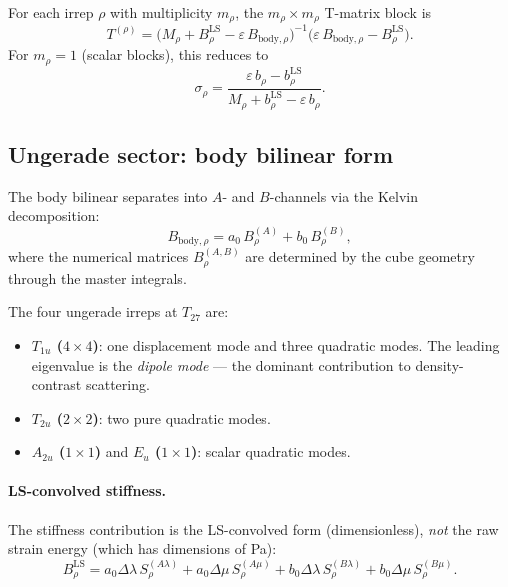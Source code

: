 \documentclass[11pt,a4paper]{article}
\newcommand{\D}{\Delta}
\newcommand{\BLS}{B^{\mathrm{LS}}}
\theoremstyle{plain}
\theoremstyle{definition}
\theoremstyle{remark}
\begin{document}
For each irrep $\rho$ with multiplicity $m_\rho$, the
$m_\rho \times m_\rho$ T-matrix block is
\begin{equation}
  \boxed{\;T^{(\rho)}
  = \bigl(M_\rho + \BLS_\rho - \varepsilon\,B_{\mathrm{body},\rho}
  \bigr)^{-1}
  \bigl(\varepsilon\,B_{\mathrm{body},\rho} - \BLS_\rho\bigr).\;}
  \label{eq:T-per-irrep}
\end{equation}
For $m_\rho = 1$ (scalar blocks), this reduces to
\begin{equation}
  \sigma_\rho
  = \frac{\varepsilon\,b_\rho - b^{\mathrm{LS}}_\rho}
    {M_\rho + b^{\mathrm{LS}}_\rho - \varepsilon\,b_\rho}.
  \label{eq:sigma-scalar}
\end{equation}

\subsection{Ungerade sector: body bilinear form}

The body bilinear separates into $A$- and $B$-channels via the Kelvin
decomposition:
\begin{equation}
  B_{\mathrm{body},\rho} = a_0\,B^{(A)}_\rho + b_0\,B^{(B)}_\rho,
  \label{eq:Bbody-AB}
\end{equation}
where the numerical matrices $B^{(A,B)}_\rho$ are determined by the
cube geometry through the master integrals.

The four ungerade irreps at $T_{27}$ are:
\begin{itemize}
  \item \textbf{$T_{1u}$ ($4 \times 4$)}: one displacement mode and
    three quadratic modes.  The leading eigenvalue is the
    \emph{dipole mode} --- the dominant contribution to density-contrast
    scattering.
  \item \textbf{$T_{2u}$ ($2 \times 2$)}: two pure quadratic modes.
  \item \textbf{$A_{2u}$ ($1 \times 1$)} and
    \textbf{$E_u$ ($1 \times 1$)}: scalar quadratic modes.
\end{itemize}

\paragraph{LS-convolved stiffness.}
The stiffness contribution is the LS-convolved form (dimensionless),
\emph{not} the raw strain energy (which has dimensions of Pa):
\begin{equation}
  \BLS_\rho
  = a_0\D\lambda\,S^{(A\lambda)}_\rho
  + a_0\D\mu\,S^{(A\mu)}_\rho
  + b_0\D\lambda\,S^{(B\lambda)}_\rho
  + b_0\D\mu\,S^{(B\mu)}_\rho.
  \label{eq:four-channel}
\end{equation}
\end{document}
